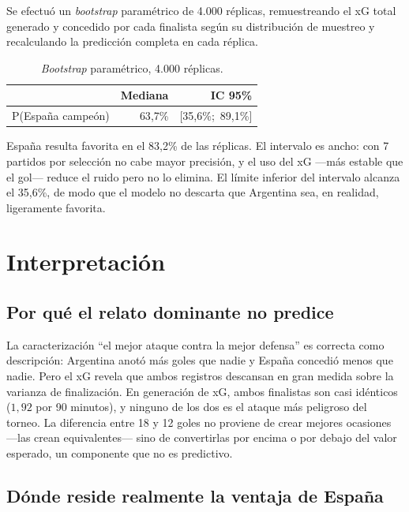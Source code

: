 \documentclass[11pt,a4paper]{article}
\begin{document}
Se efectuó un \textit{bootstrap} paramétrico de 4.000 réplicas, remuestreando el xG total generado y concedido por cada finalista según su distribución de muestreo y recalculando la predicción completa en cada réplica.

\begin{table}[htbp]
\centering
\caption{\textit{Bootstrap} paramétrico, 4.000 réplicas.}
\label{tab:boot}
\begin{tabular}{lrr}
\toprule
& \textbf{Mediana} & \textbf{IC 95\%} \\
\midrule
P(España campeón) & 63{,}7\% & [35{,}6\%;\ 89{,}1\%] \\
\bottomrule
\end{tabular}
\end{table}

España resulta favorita en el 83{,}2\% de las réplicas. El intervalo es ancho: con 7 partidos por selección no cabe mayor precisión, y el uso del xG ---más estable que el gol--- reduce el ruido pero no lo elimina. El límite inferior del intervalo alcanza el 35{,}6\%, de modo que el modelo no descarta que Argentina sea, en realidad, ligeramente favorita.

\section{Interpretación}

\subsection{Por qué el relato dominante no predice}

La caracterización ``el mejor ataque contra la mejor defensa'' es correcta como descripción: Argentina anotó más goles que nadie y España concedió menos que nadie. Pero el xG revela que ambos registros descansan en gran medida sobre la varianza de finalización. En generación de xG, ambos finalistas son casi idénticos ($1{,}92$ por 90 minutos), y ninguno de los dos es el ataque más peligroso del torneo. La diferencia entre 18 y 12 goles no proviene de crear mejores ocasiones ---las crean equivalentes--- sino de convertirlas por encima o por debajo del valor esperado, un componente que no es predictivo.

\subsection{Dónde reside realmente la ventaja de España}
\end{document}
